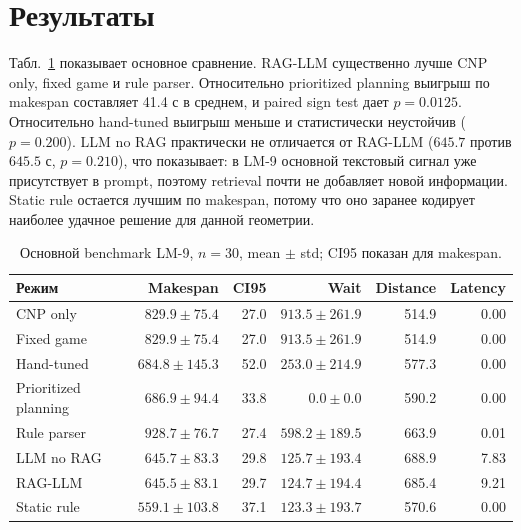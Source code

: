 \documentclass[runningheads]{llncs}
\begin{document}
\section{Результаты}

Табл.~\ref{tab:main-results} показывает основное сравнение. RAG-LLM существенно лучше CNP only, fixed game и rule parser. Относительно prioritized planning выигрыш по makespan составляет 41.4 с в среднем, и paired sign test дает $p=0.0125$. Относительно hand-tuned выигрыш меньше и статистически неустойчив ($p=0.200$). LLM no RAG практически не отличается от RAG-LLM ($645.7$ против $645.5$ с, $p=0.210$), что показывает: в LM-9 основной текстовый сигнал уже присутствует в prompt, поэтому retrieval почти не добавляет новой информации. Static rule остается лучшим по makespan, потому что оно заранее кодирует наиболее удачное решение для данной геометрии.

\begin{table}[!htbp]
\centering
\caption{Основной benchmark LM-9, $n=30$, mean $\pm$ std; CI95 показан для makespan.}
\label{tab:main-results}
\scriptsize
\begin{tabular}{lrrrrr}
\toprule
Режим & Makespan & CI95 & Wait & Distance & Latency \\
\midrule
CNP only & $829.9\pm75.4$ & 27.0 & $913.5\pm261.9$ & 514.9 & 0.00 \\
Fixed game & $829.9\pm75.4$ & 27.0 & $913.5\pm261.9$ & 514.9 & 0.00 \\
Hand-tuned & $684.8\pm145.3$ & 52.0 & $253.0\pm214.9$ & 577.3 & 0.00 \\
Prioritized planning & $686.9\pm94.4$ & 33.8 & $0.0\pm0.0$ & 590.2 & 0.00 \\
Rule parser & $928.7\pm76.7$ & 27.4 & $598.2\pm189.5$ & 663.9 & 0.01 \\
LLM no RAG & $645.7\pm83.3$ & 29.8 & $125.7\pm193.4$ & 688.9 & 7.83 \\
RAG-LLM & $645.5\pm83.1$ & 29.7 & $124.7\pm194.4$ & 685.4 & 9.21 \\
Static rule & $559.1\pm103.8$ & 37.1 & $123.3\pm193.7$ & 570.6 & 0.00 \\
\bottomrule
\end{tabular}
\end{table}
\end{document}

